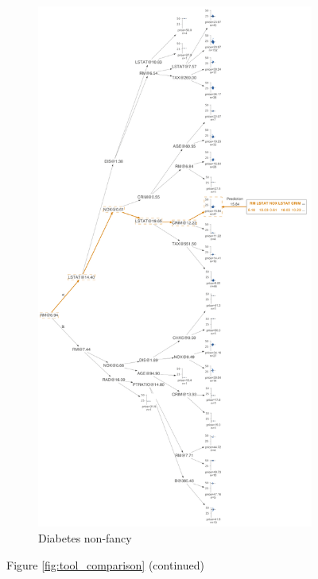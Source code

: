 \begin{figure}[p]
\begin{subfigure}{0.48\textwidth}
        \includegraphics[width=\linewidth]{images/boston-LR-5-X-simple.png}
        \caption{Diabetes non-fancy}
        \label{fig:tool_comparison_boston-LR-5-X-simple}
    \end{subfigure}
    \caption*{Figure \ref{fig:tool_comparison} (continued)}
\end{figure}

